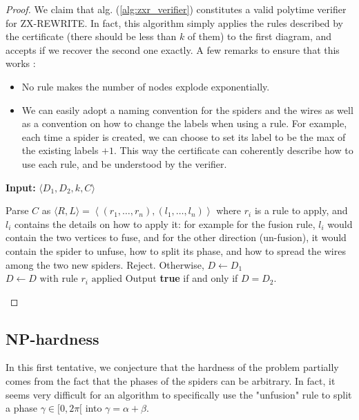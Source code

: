 \documentclass[journal,onecolumn]{IEEEtran}
\begin{document}
\begin{proof}
	We claim that alg. (\ref{alg:zxr_verifier}) constitutes a valid polytime verifier for \textsc{ZX-REWRITE}.	In fact, this algorithm simply applies the rules described by the certificate (there should 	be less than $k$ of them) to the first diagram, and accepts if we recover the second one exactly. A few remarks to ensure that this works :
	\begin{itemize}
    		\item No rule makes the number of nodes explode exponentially.
    		\item We can easily adopt a naming convention for the spiders and the wires as well as a convention on how to change the labels when using a rule. For example, each time a spider is created, we can choose to set its label to be the max of the existing labels $+ 1$. This way the certificate can coherently describe how to use each rule, and be understood by the verifier.
	\end{itemize}

\begin{algorithm}[H]
\caption{Verifier $V$}
\label{alg:zxr_verifier}
\hspace*{\algorithmicindent} \textbf{Input:} $\langle D_1, D_2, k, C \rangle$
\begin{algorithmic}[1]
\State Parse $C$ as $\langle R, L \rangle = \left\langle (r_1, \dots, r_n), (l_1, \dots, l_n) \right\rangle$ where $r_i$ is a rule to apply, and $l_i$ contains the details on how to apply it: for example for the fusion rule, $l_i$ would contain the two vertices to fuse, and for the other direction (un-fusion), it would contain the spider to unfuse, how to split its phase, and how to spread the wires among the two new spiders.
    \State Reject.
\EndIf
\State Otherwise, $D \gets D_1$
    \State $D \gets D \text{ with rule } r_i \text{ applied}$
\EndFor
\State Output \textbf{true} if and only if $D = D_2$.
\end{algorithmic}
\end{algorithm}

\end{proof}

\subsection{\textsc{NP}-hardness}

In this first tentative, we conjecture that the hardness of the problem partially comes from the fact that the phases of the spiders can be arbitrary. In fact, it seems very difficult for an algorithm to specifically use the "unfusion" rule to split a phase $\gamma \in [0, 2 \pi[$ into $\gamma = \alpha + \beta$.
\end{document}

